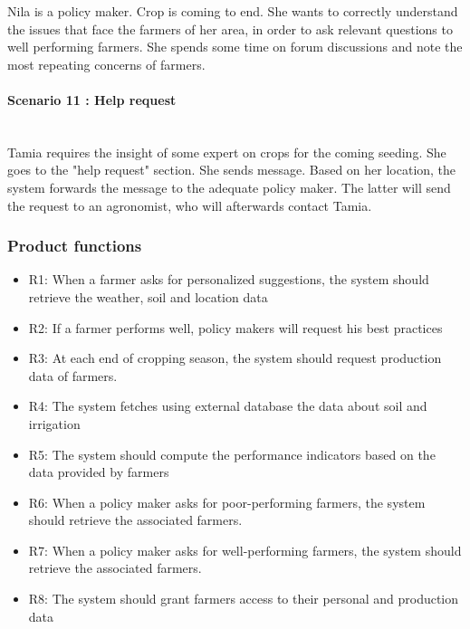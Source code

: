 Nila is a policy maker. Crop is coming to end. She wants to correctly understand the issues that face the farmers of her area, in order to ask relevant questions to well performing farmers. She spends some time on forum discussions and note the most repeating concerns of farmers.

\paragraph{Scenario 11 : Help request}\mbox{} \\

Tamia requires the insight of some expert on crops for the coming seeding. She goes to the "help request" section. She sends message. Based on her location, the system forwards the message to the adequate policy maker. The latter will send the request to an agronomist, who will afterwards contact Tamia.

\subsubsection{Product functions}

\begin{itemize}
	\item
	R1: When a farmer asks for personalized suggestions, the system should retrieve the weather, soil and location data
	\item
	R2: If a farmer performs well, policy makers will request his best practices
	\item
	R3: At each end of cropping season, the system should request production data of farmers.
	\item
	R4: The system fetches using external database the data about soil and irrigation
	\item
	R5: The system should compute the performance indicators based on the data provided by farmers
	\item
	R6: When a policy maker asks for poor-performing farmers, the system should retrieve the associated farmers.
	\item
	R7: When a policy maker asks for well-performing farmers, the system should retrieve the associated farmers.
	\item
	R8: The system should grant farmers access to their personal and production data
\end{itemize}

